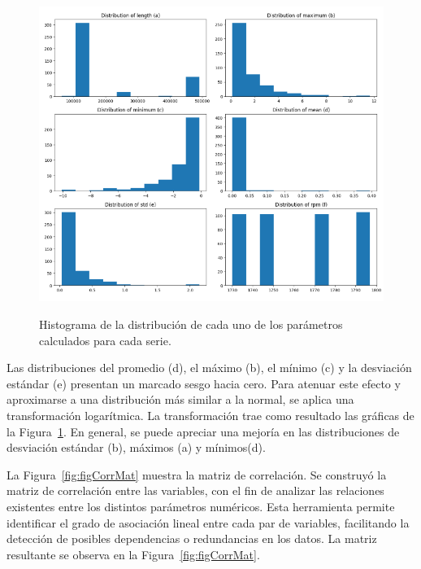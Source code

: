 \documentclass[11pt,a4paper,spanish]{book}
\numberwithin{equation}{chapter}
\numberwithin{figure}{chapter}
\begin{document}
\begin{figure}[h]
    \caption{Histograma de la distribución de cada uno de los parámetros calculados para cada serie. }
    \centering
    \includegraphics[width=1\textwidth]{media/dataset/histogram-01.png}
    \label{fig:figHistogram01}
\end{figure}


Las distribuciones del promedio (d), el máximo (b), el mínimo (c) y la desviación 
estándar (e) presentan un marcado sesgo hacia cero. Para atenuar este efecto y 
aproximarse a una distribución más similar a la normal, se aplica una transformación 
logarítmica. La transformación trae como resultado las gráficas de la 
Figura~\ref{fig:figHistogram01}. En general, se puede apreciar una mejoría en las 
distribuciones de desviación estándar (b), máximos (a) y mínimos(d). 


La Figura~\ref{fig:figCorrMat} muestra la matriz de correlación. Se
construyó la matriz de correlación entre las variables, con el fin de
analizar las relaciones existentes entre los distintos parámetros numéricos. 
Esta herramienta permite 
identificar el grado de asociación lineal entre cada par de variables, facilitando la 
detección de posibles dependencias o redundancias en los datos. La matriz resultante se 
observa en la Figura~\ref{fig:figCorrMat}. 
\end{document}
